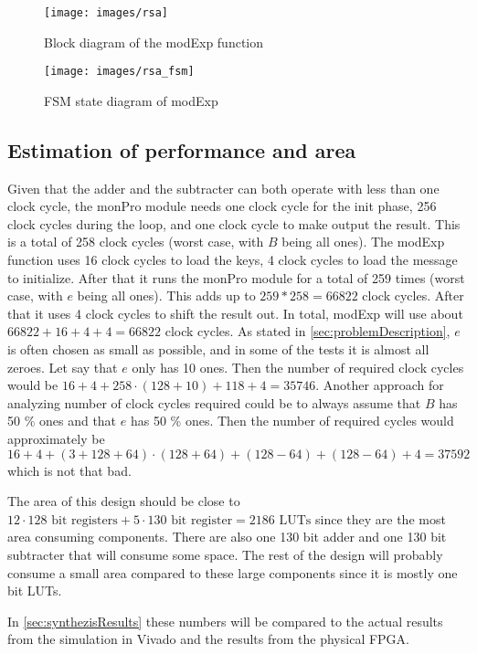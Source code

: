 \begin{figure}[htp]
    \centering
    \texttt{[image: images/rsa]}
    \caption{Block diagram of the modExp function}
    \label{fig:blockModExp}
\end{figure}

\begin{figure}[htp]
    \centering
    \texttt{[image: images/rsa\_fsm]}
    \caption{FSM state diagram of modExp}
    \label{fig:fsmModExp}
\end{figure}

\subsection{Estimation of performance and area} \label{sec:estimatePerfArea}
Given that the adder and the subtracter can both operate with less than one clock cycle, the monPro module needs one clock cycle for the init phase, 256 clock cycles during the loop, and one clock cycle to make output the result. This is a total of 258 clock cycles (worst case, with $B$ being all ones). The modExp function uses 16 clock cycles to load the keys, 4 clock cycles to load the message to initialize. After that it runs the monPro module for a total of 259 times (worst case, with $e$ being all ones). This adds up to $259*258=66822$ clock cycles. After that it uses 4 clock cycles to shift the result out. In total, modExp will use about $66822+16+4+4=66822$ clock cycles. As stated in \cref{sec:problemDescription}, $e$ is often chosen as small as possible, and in some of the tests it is almost all zeroes. Let say that $e$ only has 10 ones. Then the number of required clock cycles would be $16+4+258 \cdot (128+10)+118+4=35746$. Another approach for analyzing number of clock cycles required could be to always assume that $B$ has 50 \% ones and that $e$ has 50 \% ones. Then the number of required cycles would approximately be $16+4+(3+128+64) \cdot (128+64) +(128-64)+(128-64)+4 = 37592$ which is not that bad. 

The area of this design should be close to $12\cdot 128 \text{ bit registers} + 5\cdot 130 \text{ bit register} = 2186 \text{ LUTs}$ since they are the most area consuming components. There are also one 130 bit adder and one 130 bit subtracter that will consume some space. The rest of the design will probably consume a small area compared to these large components since it is mostly one bit LUTs.  

In \cref{sec:synthezisResults} these numbers will be compared to the actual results from the simulation in Vivado and the results from the physical FPGA.